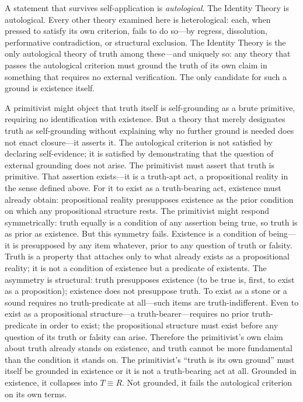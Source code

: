 \documentclass[11pt, oneside]{article}
\begin{document}
A statement that survives self-application is \textit{autological}. The
Identity Theory is autological. Every other theory examined here is
heterological: each, when pressed to satisfy its own criterion, fails to
do so---by regress, dissolution, performative contradiction, or
structural exclusion. The Identity Theory is the only autological theory
of truth among these---and uniquely so: any theory that passes the
autological criterion must ground the truth of its own claim in something
that requires no external verification. The only candidate for such a
ground is existence itself.

A primitivist might object that truth itself is self-grounding as a
brute primitive, requiring no identification with existence. But a theory
that merely designates truth as self-grounding without explaining why no
further ground is needed does not enact closure---it asserts it. The
autological criterion is not satisfied by declaring self-evidence; it is
satisfied by demonstrating that the question of external grounding does
not arise. The primitivist must assert
that truth is primitive. That assertion exists---it is a truth-apt act,
a propositional reality in the sense defined above. For it to exist as a
truth-bearing act, existence must already obtain: propositional reality
presupposes existence as the prior condition on which any propositional
structure rests. The primitivist might respond symmetrically: truth
equally is a condition of any assertion being true, so truth is as prior
as existence. But this symmetry fails. Existence is a condition of
being---it is presupposed by any item whatever, prior to any question of
truth or falsity. Truth is a property that attaches only to what already
exists as a propositional reality; it is not a condition of existence but
a predicate of existents. The asymmetry is structural: truth presupposes
existence (to be true is, first, to exist as a proposition); existence
does not presuppose truth. To exist as a stone or a sound requires no
truth-predicate at all---such items are truth-indifferent. Even to exist
as a propositional structure---a truth-bearer---requires no prior
truth-predicate in order to exist; the propositional structure must exist
before any question of its truth or falsity can arise. Therefore the
primitivist's own claim about truth already stands on existence, and
truth cannot be more fundamental than the condition it stands on. The
primitivist's ``truth is its own ground'' must itself be grounded in
existence or it is not a truth-bearing act at all. Grounded in existence,
it collapses into $T \equiv R$. Not grounded,
it fails the autological criterion on its own terms.
\end{document}

